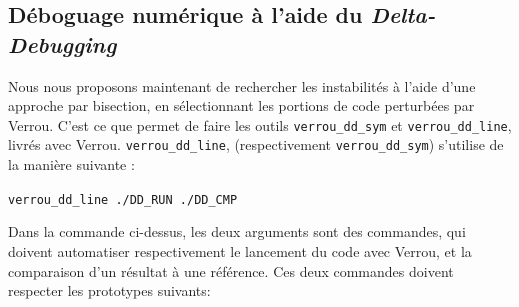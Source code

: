 \documentclass[a4paper]{article}
\begin{document}
\subsection{Déboguage numérique à l'aide du \textit{Delta-Debugging}}

Nous nous proposons maintenant de rechercher les instabilités à l'aide
d'une approche par bisection, en sélectionnant les portions de code perturbées
par Verrou. C'est ce que permet de faire les outils \texttt{verrou\_dd\_sym} et \texttt{verrou\_dd\_line}, livrés avec
Verrou. \texttt{verrou\_dd\_line}, (respectivement \texttt{verrou\_dd\_sym}) s'utilise de la manière suivante :
\begin{center}
  \tt verrou\_dd\_line ./DD\_RUN ./DD\_CMP
\end{center}

Dans la commande ci-dessus, les deux arguments sont des commandes, qui doivent
automatiser respectivement le lancement du code avec Verrou, et la comparaison
d'un résultat à une référence. Ces deux commandes doivent respecter les
prototypes suivants: \medskip
\end{document}
